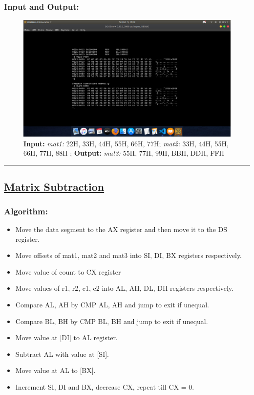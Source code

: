 \documentclass[10pt,a4paper]{article}
\begin{document}
\begin{flushleft}
\subsubsection*{\textbf{Input and Output:}}
\begin{figure}[h]
    \centering
    \includegraphics[trim = 100mm 60mm 100mm 80mm, clip, width = \textwidth]{Pics/MAIO.png}
    \caption{ \textbf{Input:} \emph{mat1:} 22H, 33H, 44H, 55H, 66H, 77H; \emph{mat2:} 33H, 44H, 55H, 66H, 77H, 88H ; \newline \hspace{1cm}
              \textbf{Output:} \emph{mat3:} 55H, 77H, 99H, BBH, DDH, FFH}
\end{figure}
\hrule
\newpage
\subsection*{\textbf{\underline{Matrix Subtraction}}}

\subsubsection*{\textbf{Algorithm:}}
\begin{itemize}
    \item Move the data segment to the AX register and then move it to the DS register.
    \item Move offsets of mat1, mat2 and mat3 into SI, DI, BX registers respectively.
    \item Move value of count to CX register
    \item Move values of r1, r2, c1, c2 into AL, AH, DL, DH registers respectively. 
    \item Compare AL, AH by CMP AL, AH and jump to exit if unequal.
    \item Compare BL, BH by CMP BL, BH and jump to exit if unequal.
    \item Move value at [DI] to AL register.
    \item Subtract AL with value at [SI].
    \item Move value at AL to [BX].
    \item Increment SI, DI and BX, decrease CX, repeat till CX = 0.
\end{itemize}


\end{flushleft}
\end{document}
